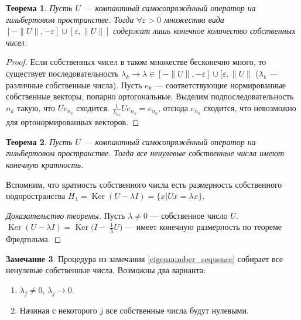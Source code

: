 \documentclass[11pt,openany,a4paper]{scrartcl}
\theoremstyle{plain}
\newtheorem{theorem}{Теорема}[section]
\theoremstyle{definition}
\newtheorem{remark}[theorem]{Замечание}
\DeclareMathOperator{\Ker}{Ker}
\begin{document}
\begin{theorem}
    Пусть $U$ — компактный самосопряжённый оператор на гильбертовом пространстве. Тогда
    $\forall \varepsilon > 0$ множества вида $[-\|U\|, -\varepsilon] \cup [\varepsilon, \|U\|]$
    содержат лишь конечное количество собственных чисел.
\end{theorem}
\begin{proof}
    Если собственных чисел в таком множестве бесконечно много, то существует последовательность
    $\lambda_k \to \lambda \in [-\|U\|, - \varepsilon] \cup [\varepsilon, \|U\|$ ($\lambda_k$ —
    различные собственные числа). Пусть $e_k$ — соответствующие нормированные собственные векторы, 
    попарно ортогональные. Выделим подпоследовательность $n_k$ такую, что $Ue_{n_k}$ сходится.
    $\frac{1}{\lambda_{n_k}}Ue_{n_k} = e_{n_k}$, отсюда $e_{n_k}$ сходится, что невозможно для
    ортонормированных векторов.
\end{proof}

\begin{theorem}
    Пусть $U$ — компактный самосопряжённый оператор на гильбертовом пространстве. Тогда
    все ненулевые собственные числа имеют конечную кратность.
\end{theorem}

Вспомним, что кратность собственного числа есть размерность собственного подпространства
$H_\lambda = \Ker (U - \lambda I) = \{x | Ux = \lambda x\}$.

\begin{proof}[Доказательство теоремы]
    Пусть $\lambda \neq 0$ — собственное число $U$.
    $\Ker(U-\lambda I) = \Ker \bigg(I -~\frac{1}{\lambda}U\bigg)$ — имеет конечную размерность
    по теореме Фредгольма.
\end{proof}

\begin{remark}
    Процедура из замечания \ref{eigennumber_sequence} собирает все ненулевые собственные числа.
    Возможны два варианта:
    \begin{enumerate}
        \item $\lambda_j \neq 0$, $\lambda_j \to 0$.
        \item Начиная с некоторого $j$ все собственные числа будут нулевыми.
    \end{enumerate}
\end{remark}
\end{document}
